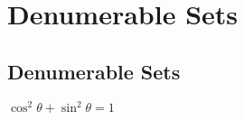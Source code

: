 \chapter{Denumerable Sets}\label{sec:denumerable-sets}

\section{Denumerable Sets}\label{sec:denumerable-sets}

\(\cos^{2}{\theta}+\sin^{2}{\theta}=1\)

